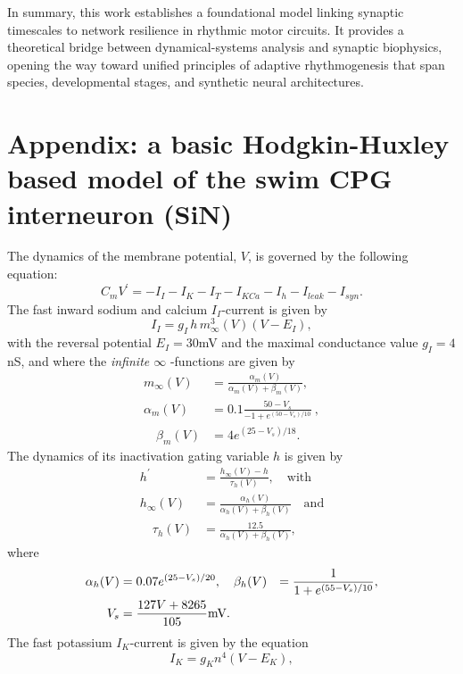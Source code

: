 \documentclass[nofootinbib,aip,amsmath,amssymb,reprint,twocolumn,10pt]{revtex4-2}
\begin{document}
In summary, this work establishes a foundational model linking synaptic timescales to network resilience in rhythmic motor circuits. It provides a theoretical bridge between dynamical-systems analysis and synaptic biophysics, opening the way toward unified principles of adaptive rhythmogenesis that span species, developmental stages, and synthetic neural architectures.


\label{fig:supp} 
\section*{Appendix: a basic Hodgkin-Huxley based model of the swim CPG interneuron (SiN)} \label{sec:appendix1}
The dynamics of the membrane potential, $V$, is governed by the following equation:
\begin{equation}
 	C_{m} {V}^\prime = -I_{I} - I_K - I_{T}  - I_{KCa} -  I_{h}  - I_{leak}  - I_{syn}.  \label{a1}
 \end{equation}
 The fast inward sodium and calcium $I_{I}$-current is given by   
\begin{equation}
I_{I}=g_{I}\,h\, m^{3}_{\infty}(V)(V-E_{I}), 
 \end{equation}
with the reversal potential $E_{I}=30$mV and the maximal conductance value $g_{I}=4$nS, and where the {\em infinite $\infty$ }-functions are given by   
\begin{align}
 m_{\infty}(V) &= \frac{\alpha_{m}(V)}{\alpha_{m}(V) +\beta_{m}(V)},   \\
 \alpha_{m}(V) &= 0.1 \frac{50-V_s}{-1+e^{(50-V_s)/10}}\ , \\ 
 \quad \beta_{m}(V) &= 4 e^{(25-V_s)/18}.  
\end{align}
 The dynamics of its inactivation  gating variable $h$ is given by      
\begin{align}
 {h}^\prime &=  \frac{h_{\infty}(V)-h}{ {\tau_{h}(V)} }, \quad \mbox{with} \quad \\
h_{\infty}(V) &= \frac{\alpha_{h}(V)}{\alpha_{h}(V) +\beta_{h}(V)}\quad \mbox{and} \\
 \quad \tau_{h}(V) &= \frac{12.5}{\alpha_{h}(V) +\beta_{h}(V)}, 
\end{align}
where 
 \begin{align}
 \alpha_{h}(V) &= 0.07 e^{(25-V_s)/20}, \quad 
 \beta_{h}(V) &= \frac{1}{1+e^{(55-V_s)/10}}, \\
 V_s &= \frac{127V+8265}{105}{\rm mV}.
 \end{align} 
  The fast potassium $I_K$-current is given by the equation  
\begin{equation}
I_K=g_{K} n^{4}(V-E_{K}),  
\end{equation}
\end{document}

